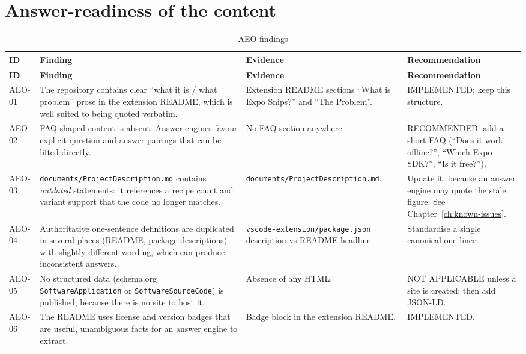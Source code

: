 \section{Answer-readiness of the content}

\begin{longtable}{@{}L{1.5cm}L{4.6cm}L{3.4cm}L{4.7cm}@{}}
\caption{AEO findings}\\
\toprule
\textbf{ID} & \textbf{Finding} & \textbf{Evidence} & \textbf{Recommendation} \\
\midrule
\endfirsthead
\toprule
\textbf{ID} & \textbf{Finding} & \textbf{Evidence} & \textbf{Recommendation} \\
\midrule
\endhead
AEO-01 & The repository contains clear ``what it is / what problem'' prose in the
extension README, which is well suited to being quoted verbatim. & Extension
README sections ``What is Expo Snips?'' and ``The Problem''. & IMPLEMENTED; keep
this structure. \\
AEO-02 & FAQ-shaped content is absent. Answer engines favour explicit question-and-answer
pairings that can be lifted directly. & No FAQ section anywhere. & RECOMMENDED:
add a short FAQ (``Does it work offline?'', ``Which Expo SDK?'', ``Is it free?''). \\
AEO-03 & \texttt{documents/ProjectDescription.md} contains \emph{outdated}
statements: it references a recipe count and variant support that the code no
longer matches. & \texttt{documents/ProjectDescription.md}. & Update it, because
an answer engine may quote the stale figure. See
Chapter~\ref{ch:known-issues}. \\
AEO-04 & Authoritative one-sentence definitions are duplicated in several places
(README, package descriptions) with slightly different wording, which can produce
inconsistent answers. & \texttt{vscode-extension/package.json} description vs
README headline. & Standardise a single canonical one-liner. \\
AEO-05 & No structured data (schema.org \texttt{SoftwareApplication} or
\texttt{SoftwareSourceCode}) is published, because there is no site to host it. &
Absence of any HTML. & NOT APPLICABLE unless a site is created; then add JSON-LD. \\
AEO-06 & The README uses license and version badges that are useful, unambiguous
facts for an answer engine to extract. & Badge block in the extension README. &
IMPLEMENTED. \\
\bottomrule
\end{longtable}

